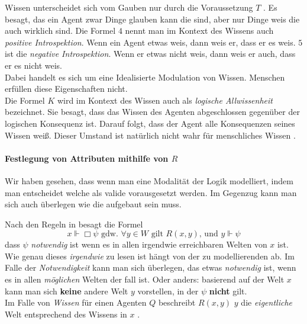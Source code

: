 Wissen unterscheidet sich vom Gauben nur durch die Voraussetzung $T$ \TFormel.
Es besagt, das ein Agent zwar Dinge glauben kann die \false sind, aber nur Dinge weis die auch wirklich \true sind.
Die Formel $4$ \vierFormel nennt man im Kontext des Wissens auch \emph{positive Introspektion}. 
Wenn ein Agent etwas weis, dann weis er, dass er es weis.
$5$ \fuenfFormel ist die \emph{negative Introspektion}. Wenn er etwas nicht weis, dann weis er auch, dass er es nicht weis.\\
Dabei handelt es sich um eine Idealisierte Modulation von Wissen.
Menschen erfüllen diese Eigenschaften nicht.\\
Die Formel $K$ \KFormel wird im Kontext des Wissen auch als \emph{logische Allwissenheit} bezeichnet.
Sie besagt, dass das Wissen des Agenten abgeschlossen gegenüber der logischen Konsequenz ist.
Darauf folgt, dass der Agent alle Konsequenzen seines Wissen weiß. 
Dieser Umstand ist natürlich nicht wahr für menschliches Wissen .


\paragraph{Festlegung von Attributen mithilfe von $R$}
\label{festlegung_von_attibuten_mit_R}

Wir haben gesehen, dass wenn man eine Modalität der Logik modelliert, indem man entscheidet welche \formelSchemata als valide vorausgesetzt werden.
Im Gegenzug kann man sich auch überlegen wie die \KS aufgebaut sein muss.

Nach den Regeln in  besagt die Formel
\begin{equation*}
	x \Vdash \Box \psi \text{ gdw. }\forall y \in W \text{ gilt } R(x,y)\text{, und } y \Vdash \psi	
\end{equation*}
dass $\psi$ \emph{notwendig} ist wenn es in allen irgendwie erreichbaren Welten von $x$ \true ist.\\
Wie genau dieses \emph{irgendwie} zu lesen ist hängt von der zu modellierenden \ML ab.
Im Falle der \emph{Notwendigkeit} kann man sich überlegen, das etwas \emph{notwendig} ist, wenn es in allen \emph{möglichen} Welten der fall ist.
Oder anders: basierend auf der Welt $x$ kann man sich \textbf{keine} andere Welt $y$ vorstellen, in der $\psi$ \textbf{nicht} gilt.\\
Im Falle von \emph{Wissen} für einen Agenten $Q$ beschreibt $R(x,y)$ $y$ die \emph{eigentliche} Welt entsprechend des Wissens in $x$ .

